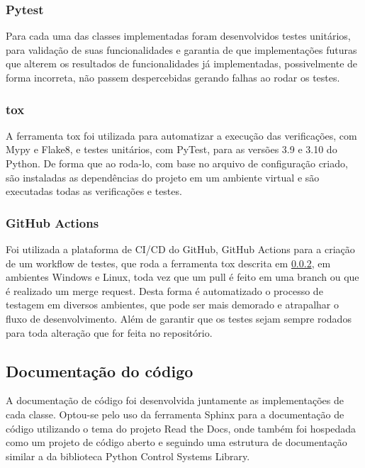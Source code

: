\subsubsection{Pytest}

Para cada uma das classes implementadas foram desenvolvidos testes unitários, para validação de suas funcionalidades e
garantia de que implementações futuras que alterem os resultados de funcionalidades já implementadas, possivelmente de
forma incorreta, não passem despercebidas gerando falhas ao rodar os testes.

\subsubsection{tox}\label{subsubsec:devtox}

A ferramenta tox foi utilizada para automatizar a execução das verificações, com Mypy e Flake8, e testes unitários, com
PyTest, para as versões 3.9 e 3.10 do Python.
De forma que ao roda-lo, com base no arquivo de configuração criado, são instaladas as dependências do projeto em um
ambiente virtual e são executadas todas as verificações e testes.

\subsubsection{GitHub Actions}

Foi utilizada a plataforma de CI/CD do GitHub, GitHub Actions para a criação de um workflow de testes, que roda a
ferramenta tox descrita em \ref{subsubsec:devtox}, em ambientes Windows e Linux, toda vez que um pull é feito em uma
branch ou que é realizado um merge request.
Desta forma é automatizado o processo de testagem em diversos ambientes, que pode ser mais demorado e atrapalhar o
fluxo de desenvolvimento.
Além de garantir que os testes sejam sempre rodados para toda alteração que for feita no repositório.

\subsection{Documentação do código}

A documentação de código foi desenvolvida juntamente as implementações de cada classe.
Optou-se pelo uso da ferramenta Sphinx para a documentação de código utilizando o tema do projeto Read the Docs, onde
também foi hospedada como um projeto de código aberto e seguindo uma estrutura de documentação similar a da
biblioteca Python Control Systems Library.

